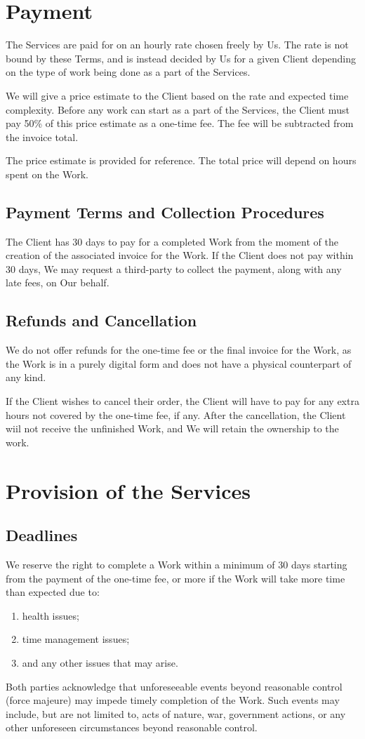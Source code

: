 \documentclass{article}
\begin{document}
\section{Payment}
The Services are paid for on an hourly rate chosen freely by Us. The rate is not bound by these Terms, and is instead decided by Us for a given Client depending on the type of work being done as a part of the Services.

We will give a price estimate to the Client based on the rate and expected time complexity. Before any work can start as a part of the Services, the Client must pay 50\% of this price estimate as a one-time fee. The fee will be subtracted from the invoice total.

The price estimate is provided for reference. The total price will depend on hours spent on the Work.

\subsection{Payment Terms and Collection Procedures}
The Client has 30 days to pay for a completed Work from the moment of the creation of the associated invoice for the Work. If the Client does not pay within 30 days, We may request a third-party to collect the payment, along with any late fees, on Our behalf.

\subsection{Refunds and Cancellation}
We do not offer refunds for the one-time fee or the final invoice for the Work, as the Work is in a purely digital form and does not have a physical counterpart of any kind.

If the Client wishes to cancel their order, the Client will have to pay for any extra hours not covered by the one-time fee, if any. After the cancellation, the Client wiil not receive the unfinished Work, and We will retain the ownership to the work.

\section{Provision of the Services}
\subsection{Deadlines}
We reserve the right to complete a Work within a minimum of 30 days starting from the payment of the one-time fee, or more if the Work will take more time than expected due to:
\begin{enumerate}
    \item health issues;
    \item time management issues; %
    \item and any other issues that may arise.
\end{enumerate}
Both parties acknowledge that unforeseeable events beyond reasonable control (force majeure) may impede timely completion of the Work. Such events may include, but are not limited to, acts of nature, war, government actions, or any other unforeseen circumstances beyond reasonable control.
\end{document}
